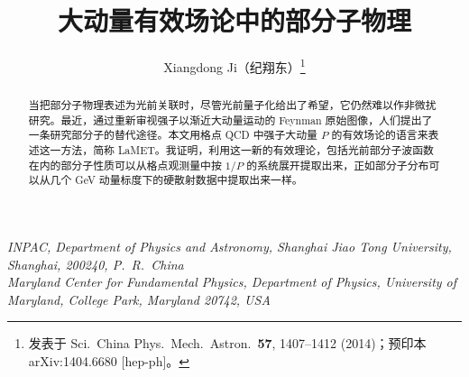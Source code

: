 \documentclass[11pt]{ctexart}
\title{\bfseries 大动量有效场论中的部分子物理}
\author{Xiangdong Ji（纪翔东）\thanks{发表于 Sci.\ China Phys.\ Mech.\ Astron.\ \textbf{57}, 1407--1412 (2014)；预印本 arXiv:1404.6680 [hep-ph]。}}
\date{}
\begin{document}
\maketitle
\vspace{-2.5em}
\begin{center}\itshape
INPAC, Department of Physics and Astronomy, Shanghai Jiao Tong University,
Shanghai, 200240, P.\ R.\ China\\
Maryland Center for Fundamental Physics, Department of Physics,
University of Maryland, College Park, Maryland 20742, USA
\end{center}

\begin{abstract}
当把部分子物理表述为光前关联时，尽管光前量子化给出了希望，它仍然难以作非微扰研究。最近，通过重新审视强子以渐近大动量运动的 Feynman 原始图像，人们提出了一条研究部分子的替代途径。本文用格点 QCD 中强子大动量 $P$ 的有效场论的语言来表述这一方法，简称 LaMET。我证明，利用这一新的有效理论，包括光前部分子波函数在内的部分子性质可以从格点观测量中按 $1/P$ 的系统展开提取出来，正如部分子分布可以从几个 GeV 动量标度下的硬散射数据中提取出来一样。
\end{abstract}



\end{document}
